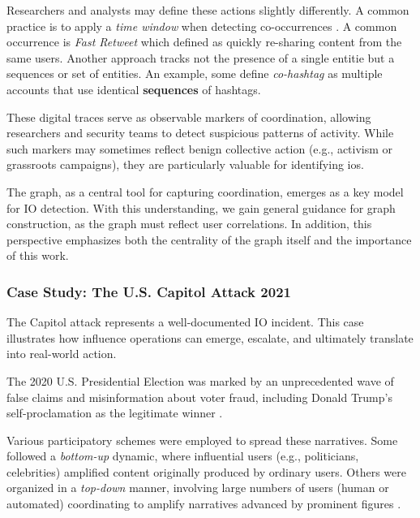 \documentclass{article}
\begin{document}
Researchers and analysts may define these actions slightly differently. A common practice is to apply a \textit{time window} when detecting co-occurrences \cite{toolkit2024coordination}. A common occurrence is \textit{Fast Retweet} which defined as quickly re-sharing content from the same users. \cite{luceri2024unmasking}
Another approach tracks not the presence of a single entitie but a sequences or set of entities. An example, some define \textit{co-hashtag} as multiple accounts that use identical \textbf{sequences} of hashtags. \cite{SocioLinguistic2024coordinated}

These digital traces serve as observable markers of coordination, allowing researchers and security teams to detect suspicious patterns of activity. While such markers may sometimes reflect benign collective action (e.g., activism or grassroots campaigns), they are particularly valuable for identifying \acp{io}. \cite{coordinated2021UK}

The graph, as a central tool for capturing coordination, emerges as a key model for IO detection. With this understanding, we gain general guidance for graph construction, as the graph must reflect user correlations. In addition, this perspective emphasizes both the centrality of the graph itself and the importance of this work.

\subsubsection{Case Study: The U.S. Capitol Attack 2021}

The Capitol attack represents a well-documented IO incident. This case illustrates how influence operations can emerge, escalate, and ultimately translate into real-world action.

The 2020 U.S. Presidential Election was marked by an unprecedented wave of false claims and misinformation about voter fraud, including Donald Trump’s self-proclamation as the legitimate winner \cite{fringe2022election2020, database2022election2020}.

Various participatory schemes were employed to spread these narratives. Some followed a \textit{bottom-up} dynamic, where influential users (e.g., politicians, celebrities) amplified content originally produced by ordinary users. Others were organized in a \textit{top-down} manner, involving large numbers of users (human or automated) coordinating to amplify narratives advanced by prominent figures \cite{Characterizing2020USElection, TrollHunter2021USElections}.
\end{document}
